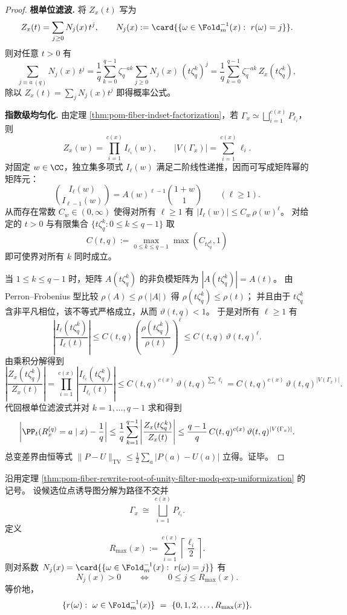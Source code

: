 \begin{proof}
\textbf{根单位滤波.}
将 \(Z_x(t)\) 写为
\[
Z_x(t)=\sum_{j\ge 0}N_j(x)\,t^j,
\qquad
N_j(x):=\card{\{\omega\in\Fold_m^{-1}(x):\ r(\omega)=j\}}.
\]
则对任意 \(t>0\) 有
\[
\sum_{j\equiv a\ (q)}N_j(x)\,t^j
=\frac{1}{q}\sum_{k=0}^{q-1}\zeta_q^{-ak}\sum_{j\ge 0}N_j(x)\,(t\zeta_q^k)^{j}
=\frac{1}{q}\sum_{k=0}^{q-1}\zeta_q^{-ak}\,Z_x(t\zeta_q^k),
\]
除以 \(Z_x(t)=\sum_j N_j(x)t^j\) 即得概率公式。
\par
\textbf{指数级均匀化.}
由定理 \ref{thm:pom-fiber-indset-factorization}，若 \(\Gamma_x\simeq \bigsqcup_{i=1}^{c(x)} P_{\ell_i}\)，则
\[
Z_x(w)=\prod_{i=1}^{c(x)} I_{\ell_i}(w),
\qquad
|V(\Gamma_x)|=\sum_{i=1}^{c(x)} \ell_i.
\]
对固定 \(w\in\CC\)，独立集多项式 \(I_\ell(w)\) 满足二阶线性递推，因而可写成矩阵幂的矩阵元：
\[
\binom{I_\ell(w)}{I_{\ell-1}(w)}=A(w)^{\ell-1}\binom{1+w}{1}\qquad(\ell\ge 1).
\]
从而存在常数 \(C_w\in(0,\infty)\) 使得对所有 \(\ell\ge 1\) 有 \(|I_\ell(w)|\le C_w\,\rho(w)^\ell\)。
对给定的 \(t>0\) 与有限集合 \(\{t\zeta_q^k:0\le k\le q-1\}\) 取
\[
C(t,q):=\max_{0\le k\le q-1}\max(C_{t\zeta_q^k},1)
\]
即可使界对所有 \(k\) 同时成立。
\par
当 \(1\le k\le q-1\) 时，矩阵 \(A(t\zeta_q^k)\) 的非负模矩阵为 \(|A(t\zeta_q^k)|=A(t)\)。
由 Perron--Frobenius 型比较 \(\rho(A)\le \rho(|A|)\) 得 \(\rho(t\zeta_q^k)\le \rho(t)\)；
并且由于 \(t\zeta_q^k\) 含非平凡相位，该不等式严格成立，从而 \(\vartheta(t,q)<1\)。
于是对所有 \(\ell\ge 1\) 有
\[
\left|\frac{I_\ell(t\zeta_q^k)}{I_\ell(t)}\right|
\le
C(t,q)\left(\frac{\rho(t\zeta_q^k)}{\rho(t)}\right)^\ell
\le
C(t,q)\,\vartheta(t,q)^\ell.
\]
由乘积分解得到
\[
\left|\frac{Z_x(t\zeta_q^k)}{Z_x(t)}\right|
=\prod_{i=1}^{c(x)}\left|\frac{I_{\ell_i}(t\zeta_q^k)}{I_{\ell_i}(t)}\right|
\le C(t,q)^{c(x)}\,\vartheta(t,q)^{\sum_i\ell_i}
=C(t,q)^{c(x)}\,\vartheta(t,q)^{|V(\Gamma_x)|}.
\]
代回根单位滤波式并对 \(k=1,\dots,q-1\) 求和得到
\[
\left|\PP_t(R_x^{(q)}=a\mid x)-\frac{1}{q}\right|
\le \frac{1}{q}\sum_{k=1}^{q-1}\left|\frac{Z_x(t\zeta_q^k)}{Z_x(t)}\right|
\le \frac{q-1}{q}\,C(t,q)^{c(x)}\,\vartheta(t,q)^{|V(\Gamma_x)|}.
\]
总变差界由恒等式
\(
\|P-U\|_{\mathrm{TV}}\le \tfrac12\sum_a |P(a)-U(a)|
\)
立得。证毕。
\end{proof}

\begin{corollary}[逆代换次数谱的无缺口区间性]\label{cor:pom-fiber-rewrite-spectrum-no-gaps}
沿用定理 \ref{thm:pom-fiber-rewrite-root-of-unity-filter-modq-exp-uniformization} 的记号。
设候选位点诱导图分解为路径不交并
\[
\Gamma_x\ \cong\ \bigsqcup_{i=1}^{c(x)} P_{\ell_i}.
\]
定义
\[
R_{\max}(x):=\sum_{i=1}^{c(x)}\left\lceil \frac{\ell_i}{2}\right\rceil.
\]
则对系数 \(N_j(x)=\card{\{\omega\in\Fold_m^{-1}(x):\ r(\omega)=j\}}\) 有
\[
N_j(x)>0\qquad\Longleftrightarrow\qquad 0\le j\le R_{\max}(x).
\]
等价地，
\[
\{r(\omega):\ \omega\in\Fold_m^{-1}(x)\}\ =\ \{0,1,2,\dots,R_{\max}(x)\}.
\]
\end{corollary}

